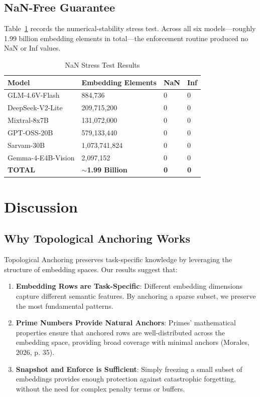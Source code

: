 \documentclass{article}
\begin{document}
\subsection{NaN-Free Guarantee}

Table~\ref{tab:nan-test} records the numerical-stability stress test. Across all six models---roughly 1.99 billion embedding elements in total---the enforcement routine produced no NaN or Inf values.

\begin{table}[H]
\centering
\caption{NaN Stress Test Results}
\label{tab:nan-test}
\begin{tabular}{llll}
\toprule
Model & Embedding Elements & NaN & Inf \\
\midrule
GLM-4.6V-Flash & 884,736 & 0 & 0 \\
DeepSeek-V2-Lite & 209,715,200 & 0 & 0 \\
Mixtral-8x7B & 131,072,000 & 0 & 0 \\
GPT-OSS-20B & 579,133,440 & 0 & 0 \\
Sarvam-30B & 1,073,741,824 & 0 & 0 \\
Gemma-4-E4B-Vision & 2,097,152 & 0 & 0 \\
\midrule
\textbf{TOTAL} & \textbf{$\sim$1.99 Billion} & \textbf{0} & \textbf{0} \\
\bottomrule
\end{tabular}
\end{table}

\section{Discussion}

\subsection{Why Topological Anchoring Works}

Topological Anchoring preserves task-specific knowledge by leveraging the structure of embedding spaces. Our results suggest that:

\begin{enumerate}
\item \textbf{Embedding Rows are Task-Specific}: Different embedding dimensions capture different semantic features. By anchoring a sparse subset, we preserve the most fundamental patterns.

\item \textbf{Prime Numbers Provide Natural Anchors}: Primes' mathematical properties ensure that anchored rows are well-distributed across the embedding space, providing broad coverage with minimal anchors (Morales, 2026, p. 35).

\item \textbf{Snapshot and Enforce is Sufficient}: Simply freezing a small subset of embeddings provides enough protection against catastrophic forgetting, without the need for complex penalty terms or buffers.
\end{enumerate}
\end{document}
